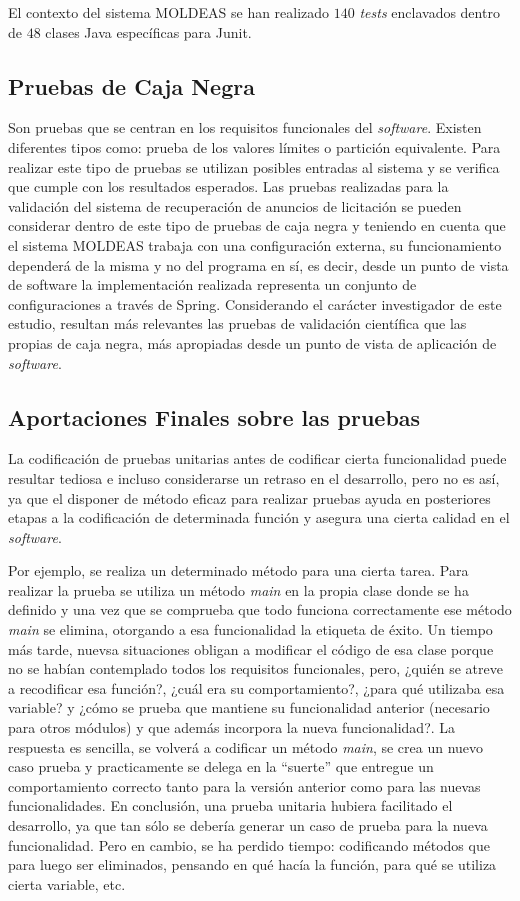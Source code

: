 El contexto del sistema \gls{MOLDEAS} se han realizado $140$ \textit{tests} enclavados 
dentro de $48$ clases Java específicas para Junit.

\subsection{Pruebas de Caja Negra}
Son pruebas que se centran en los requisitos funcionales del
\textit{software}. Existen diferentes tipos como: prueba de los valores
límites o partición equivalente. Para realizar este tipo de pruebas se utilizan
posibles entradas al sistema y se verifica que cumple con los resultados
esperados. Las pruebas realizadas para la validación del sistema de recuperación 
de anuncios de licitación se pueden considerar dentro de este tipo de pruebas de caja negra y teniendo en cuenta
que el sistema \gls{MOLDEAS} trabaja con una configuración externa, su funcionamiento
dependerá de la misma y no del programa en sí, es decir, desde un punto de vista
de software la implementación realizada representa un conjunto de 
configuraciones a través de Spring. Considerando el carácter investigador 
de este estudio, resultan más relevantes las pruebas de
validación científica que las propias de caja negra, más apropiadas 
desde un punto de vista de aplicación de \textit{software}.


\subsection{Aportaciones Finales sobre las pruebas}
La codificación de pruebas unitarias antes de codificar cierta funcionalidad
puede resultar tediosa e incluso considerarse un retraso en el desarrollo, pero
no es así, ya que el disponer de método eficaz para realizar pruebas ayuda en
posteriores etapas a la codificación de determinada función y asegura una cierta
calidad en el \textit{software}. 

Por ejemplo, se realiza un determinado método para una cierta tarea. Para realizar la prueba se utiliza 
un método \textit{main} en la propia clase donde se ha definido y una vez que se comprueba que todo
funciona correctamente ese método \textit{main} se elimina, otorgando a esa
funcionalidad la etiqueta de éxito. Un tiempo más tarde, nuevsa situaciones obligan a 
modificar el código de esa clase porque no se habían contemplado todos los
requisitos funcionales, pero, ¿quién se atreve a recodificar esa función?, ¿cuál era su comportamiento?, 
¿para qué utilizaba esa variable? y ¿cómo se prueba que mantiene su funcionalidad anterior (necesario para otros módulos) y 
que además incorpora la nueva funcionalidad?. La respuesta es sencilla, se volverá a codificar un método
\textit{main}, se crea un nuevo caso prueba y practicamente se delega en la ``suerte'' que entregue 
un comportamiento correcto tanto para la versión anterior como para las nuevas funcionalidades. En 
conclusión, una prueba unitaria hubiera facilitado el desarrollo, ya que tan sólo se debería generar un
caso de prueba para la nueva funcionalidad. Pero en cambio, se ha perdido tiempo: codificando métodos que 
para luego ser eliminados, pensando en qué hacía la función, para qué se utiliza cierta variable, etc. 

